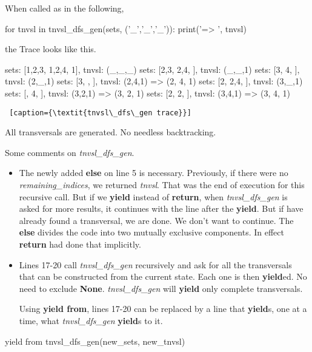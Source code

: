 When called as in the following,

\begin{minipage}[c]{0.45\textwidth}
\begin{python1}  
for tnvsl in tnvsl_dfs_gen(sets, ('_','_','_')):
    print('=> ', tnvsl)
\end{python1}
\end{minipage}

the Trace looks like this.

\begin{minipage}[c]{0.45\textwidth}
\begin{python1}  
sets: [{1,2,3}, {1,2,4}, {1}], tnvsl: (_,_,_)
  sets: [{2,3}, {2,4}, {}], tnvsl: (_,_,1)
    sets: [{3}, {4}, {}], tnvsl: (2,_,1)
      sets: [{3}, {}, {}], tnvsl: (2,4,1)
=>  (2, 4, 1)
    sets: [{2}, {2,4}, {}], tnvsl: (3,_,1)
      sets: [{}, {4}, {}], tnvsl: (3,2,1)
=>  (3, 2, 1)
      sets: [{2}, {2}, {}], tnvsl: (3,4,1)
=>  (3, 4, 1)
\end{python1}\linv
\begin{lstlisting} [caption={\textit{tnvsl\_dfs\_gen trace}}]
\end{lstlisting}
\end{minipage}

All transversals are generated. No needless backtracking.

Some comments on \textit{tnvsl\_dfs\_gen}.
\begin{itemize}
    \item The newly added \textbf{else} on line 5 is necessary. Previously, if there were no \textit{remaining\_indices}, we returned \textit{tnvsl}. That was the end of execution for this recursive call. But if we \textbf{yield} instead of \textbf{return}, when \textit{tnvsl\_dfs\_gen} is asked for more results, it continues with the line after the \textbf{yield}. But if have already found a transversal, we are done. We don't want to continue. The \textbf{else} divides the code into two mutually exclusive components. In effect \textbf{return} had done that implicitly.
    
    \item Lines 17-20 call \textit{tnvsl\_dfs\_gen} recursively and ask for all the transversals that can be constructed from the current state. Each one is then \textbf{yield}ed. No need to exclude \textbf{None}.  \textit{tnvsl\_dfs\_gen} will \textbf{yield} only complete transversals. 
    
    \smallv
Using \textbf{yield from}, lines 17-20 can be replaced by a line that \textbf{yield}s, one at a time, what \textit{tnvsl\_dfs\_gen} \textbf{yield}s to it.
\end{itemize}
\begin{center}
\begin{minipage}[c]{0.45\textwidth}
\begin{python1}
yield from tnvsl_dfs_gen(new_sets, new_tnvsl)
\end{python1}
\end{minipage}   
\end{center}

